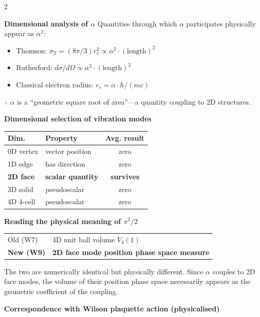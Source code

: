 \documentclass[9pt,a4paper]{article}
\begin{document}
\begin{multicols}{2}
\small

\textbf{Dimensional analysis of $\alpha$}\enspace
Quantities through which $\alpha$ participates physically appear as $\alpha^2$:
\begin{itemize}[topsep=1pt]
\item Thomson: $\sigma_T = (8\pi/3) r_e^2 \propto \alpha^2 \cdot (\text{length})^2$
\item Rutherford: $d\sigma/d\Omega \propto \alpha^2 \cdot (\text{length})^2$
\item Classical electron radius: $r_e = \alpha \cdot \hbar/(mc)$
\end{itemize}
$\therefore$ $\alpha$ is a ``geometric square root of area''---a quantity coupling to 2D structures.

\smallskip
\textbf{Dimensional selection of vibration modes}\enspace

\vspace{1pt}
{\footnotesize
\begin{tabular}{@{}llc@{}}
\toprule
Dim. & Property & Avg. result \\
\midrule
0D vertex & vector position & zero \\
1D edge & has direction & zero \\
\textbf{2D face} & \textbf{scalar quantity} & \textbf{survives} \\
3D solid & pseudoscalar & zero \\
4D 4-cell & pseudoscalar & zero \\
\bottomrule
\end{tabular}
}

\smallskip
\textbf{Reading the physical meaning of $\pi^2/2$}

\vspace{1pt}
{\footnotesize
\begin{tabular}{@{}ll@{}}
\toprule
Old (W7) & 4D unit ball volume $V_4(1)$ \\
\textbf{New (W9)} & \textbf{2D face mode position phase space measure} \\
\bottomrule
\end{tabular}
}

\smallskip
The two are numerically identical but physically different. Since $\alpha$ couples to 2D face modes, the volume of their position phase space necessarily appears as the geometric coefficient of the coupling.

\columnbreak

\textbf{Correspondence with Wilson plaquette action (physicalised)}


\end{multicols}
\end{document}
